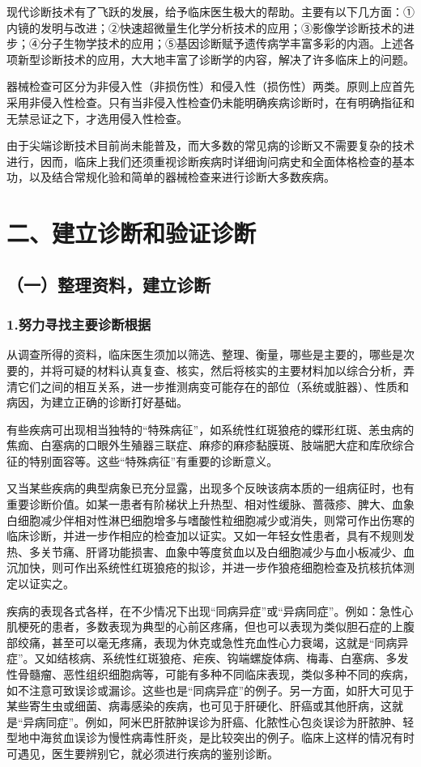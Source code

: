 现代诊断技术有了飞跃的发展，给予临床医生极大的帮助。主要有以下几方面：①内镜的发明与改进；②快速超微量生化学分析技术的应用；③影像学诊断技术的进步；④分子生物学技术的应用；⑤基因诊断赋予遗传病学丰富多彩的内涵。上述各项新型诊断技术的应用，大大地丰富了诊断学的内容，解决了许多临床上的问题。

器械检查可区分为非侵入性（非损伤性）和侵入性（损伤性）两类。原则上应首先采用非侵入性检查。只有当非侵入性检查仍未能明确疾病诊断时，在有明确指征和无禁忌证之下，才选用侵入性检查。

由于尖端诊断技术目前尚未能普及，而大多数的常见病的诊断又不需要复杂的技术进行，因而，临床上我们还须重视诊断疾病时详细询问病史和全面体格检查的基本功，以及结合常规化验和简单的器械检查来进行诊断大多数疾病。

\section{二、建立诊断和验证诊断}

\subsection{（一）整理资料，建立诊断}

\subsubsection{1.努力寻找主要诊断根据}

从调查所得的资料，临床医生须加以筛选、整理、衡量，哪些是主要的，哪些是次要的，并将可疑的材料认真复查、核实，然后将核实的主要材料加以综合分析，弄清它们之间的相互关系，进一步推测病变可能存在的部位（系统或脏器）、性质和病因，为建立正确的诊断打好基础。

有些疾病可出现相当独特的“特殊病征”，如系统性红斑狼疮的蝶形红斑、恙虫病的焦痂、白塞病的口眼外生殖器三联症、麻疹的麻疹黏膜斑、肢端肥大症和库欣综合征的特别面容等。这些“特殊病征”有重要的诊断意义。

又当某些疾病的典型病象已充分显露，出现多个反映该病本质的一组病征时，也有重要诊断价值。如某一患者有阶梯状上升热型、相对性缓脉、蔷薇疹、脾大、血象白细胞减少伴相对性淋巴细胞增多与嗜酸性粒细胞减少或消失，则常可作出伤寒的临床诊断，并进一步作相应的检查加以证实。又如一年轻女性患者，具有不规则发热、多关节痛、肝肾功能损害、血象中等度贫血以及白细胞减少与血小板减少、血沉加快，则可作出系统性红斑狼疮的拟诊，并进一步作狼疮细胞检查及抗核抗体测定以证实之。

疾病的表现各式各样，在不少情况下出现“同病异症”或“异病同症”。例如：急性心肌梗死的患者，多数表现为典型的心前区疼痛，但也可以表现为类似胆石症的上腹部绞痛，甚至可以毫无疼痛，表现为休克或急性充血性心力衰竭，这就是“同病异症”。又如结核病、系统性红斑狼疮、疟疾、钩端螺旋体病、梅毒、白塞病、多发性骨髓瘤、恶性组织细胞病等，可能有多种不同临床表现，类似多种不同的疾病，如不注意可致误诊或漏诊。这些也是“同病异症”的例子。另一方面，如肝大可见于某些寄生虫或细菌、病毒感染的疾病，也可见于肝硬化、肝癌或其他肝病，这就是“异病同症”。例如，阿米巴肝脓肿误诊为肝癌、化脓性心包炎误诊为肝脓肿、轻型地中海贫血误诊为慢性病毒性肝炎，是比较突出的例子。临床上这样的情况有时可遇见，医生要辨别它，就必须进行疾病的鉴别诊断。

